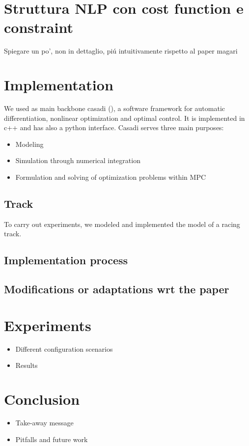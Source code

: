 \documentclass[a4paper, onecolumn, 11pt, twoside]{article}
\begin{document}
\newpage
\section*{Struttura NLP con cost function e constraint}

Spiegare un po', non in dettaglio, piú intuitivamente rispetto al paper magari

\section*{Implementation}

We used as main backbone casadi (\cite{casadi}), a software framework for automatic
differentiation, nonlinear optimization and optimal control. It is implemented
in c++ and has also a python interface. Casadi serves three main purposes:
\begin{itemize}
    \item Modeling
    \item Simulation through numerical integration
    \item Formulation and solving of optimization problems within MPC
\end{itemize}

\subsection*{Track}

To carry out experiments, we modeled and implemented the model of a racing
track. 

\subsection*{Implementation process}

\subsection*{Modifications or adaptations wrt the paper}


\section*{Experiments}


\begin{itemize}
    \item Different configuration scenarios
    \item Results
\end{itemize}



\section*{Conclusion}

\begin{itemize}
    \item Take-away message
    \item Pitfalls and future work
\end{itemize}




\end{document}
